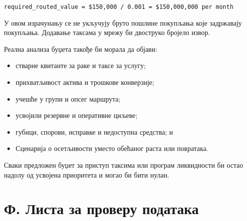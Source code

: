 \documentclass[11pt]{article}
\begin{document}
\texttt{required\_routed\_value = \$150,000 / 0.001 = \$150,000,000 per month}

У овом израчунању се не укључују бруто пошлине покупљања које задржавају покупљања. Додавање таксама у мрежу би двоструко бројело извор.

Реална анализа буџета такође би морала да објави:

\begin{itemize}[leftmargin=*]
\item стварне квитанте за раке и таксе за услугу;
\item прихватљивост актива и трошкове конверзије;
\item учешће у групи и опсег маршрута;
\item усвојили резервне и оперативне циљеве;
\item губици, спорови, исправке и недоступна средства; и
\item Сценарија о осетљивости уместо обећаног раста или повратака.
\end{itemize}
Сваки предложен буџет за приступ таксима или програм ликвидности би остао надолу од усвојена приоритета и могао би бити нулан.


\section*{Ф. Листа за проверу података}
\end{document}
